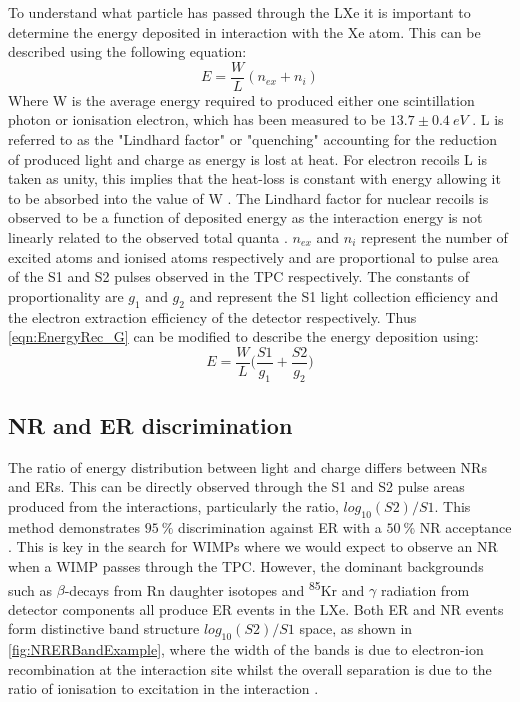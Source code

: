 To understand what particle has passed through the LXe it is important to determine the energy deposited in interaction with the Xe atom. This can be described using the following equation:
\begin{equation}
    E=\frac{W}{L}(n_{ex}+n_{i})
    \label{eqn:EnergyRec_noG}
\end{equation}
Where W is the average energy required to produced either one scintillation photon or ionisation electron, which has been measured to be $13.7\pm0.4~eV$ \cite{Goetzke:2016lfg, Dahl:2009nta}.
L is referred to as the "Lindhard factor" or "quenching" accounting for the reduction of produced light and charge as energy is lost at heat. For electron recoils L is taken as unity, this implies that the heat-loss is constant with energy allowing it to be absorbed into the value of W \cite{Rischbieter:2022}. The Lindhard factor for nuclear recoils is observed to be a function of deposited energy as the interaction energy is not linearly related to the observed total quanta \cite{Sorensen:2011bd}.
$n_{ex}$ and $n_{i}$ represent the number of excited atoms and ionised atoms respectively and are proportional to pulse area of the S1 and S2 pulses observed in the TPC respectively. The constants of proportionality are $g_1$ and $g_2$ and represent the S1 light collection efficiency and the electron extraction efficiency of the detector respectively. Thus \autoref{eqn:EnergyRec_G} can be modified to describe the energy deposition using:
\begin{equation}
    E=\frac{W}{L}\bigg(\frac{S1}{g_1}+\frac{S2}{g_2}\biggl)
    \label{eqn:EnergyRec_G}
\end{equation}

\subsection{NR and ER discrimination}
The ratio of energy distribution between light and charge differs between NRs and ERs. This can be directly observed through the S1 and S2 pulse areas produced from the interactions, particularly the ratio, $log_{10}(S2)/S1$. This method demonstrates $95~\%$ discrimination against ER with a $50~\%$ NR acceptance \cite{lzSens}. This is key in the search for WIMPs where we would expect to observe an NR when a WIMP passes through the TPC. However, the dominant backgrounds such as $\beta$-decays from Rn daughter isotopes and \textsuperscript{85}Kr and $\gamma$ radiation from detector components all produce ER events in the LXe. Both ER and NR events form distinctive band structure $log_{10}(S2)/S1$ space, as shown in \autoref{fig:NRERBandExample}, where the width of the bands is due to electron-ion recombination at the interaction site whilst the overall separation is due to the ratio of ionisation to excitation in the interaction \cite{Dahl:2009nta}.

